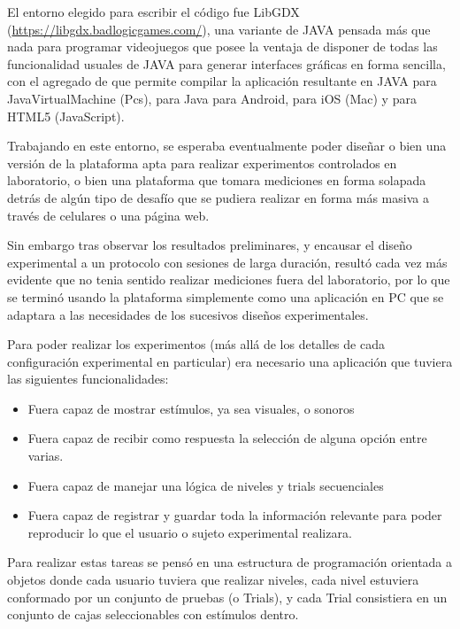 \documentclass{article}
\numberwithin{figure}{section}
\begin{document}
    El entorno elegido para escribir el código fue LibGDX (\url{https://libgdx.badlogicgames.com/}), una variante de JAVA pensada más que nada para programar videojuegos que posee la ventaja de disponer de todas las funcionalidad usuales de JAVA para generar interfaces gráficas en forma sencilla, con el agregado de que permite compilar la aplicación resultante en JAVA para JavaVirtualMachine (Pcs), para Java para Android, para iOS (Mac) y para HTML5 (JavaScript). 
    
    Trabajando en este entorno, se esperaba eventualmente poder diseñar o bien una versión de la plataforma apta para realizar experimentos controlados en laboratorio, o bien una plataforma que tomara mediciones en forma solapada detrás de algún tipo de desafío que se pudiera realizar en forma más masiva a través de celulares o una página web. 
    
    Sin embargo tras observar los resultados preliminares, y encausar el diseño experimental a un protocolo con sesiones de larga duración, resultó cada vez más evidente que no tenia sentido realizar mediciones fuera del laboratorio, por lo que se terminó usando la plataforma simplemente como una aplicación en PC que se adaptara a las necesidades de los sucesivos diseños experimentales. 
    
    Para poder realizar los experimentos (más allá de los detalles de cada configuración experimental en particular) era necesario una aplicación que tuviera las siguientes funcionalidades:
    
    \begin{itemize}
        \item Fuera capaz de mostrar estímulos, ya sea visuales, o sonoros
        \item Fuera capaz de recibir como respuesta la selección de alguna opción entre varias.
        \item Fuera capaz de manejar una lógica de niveles y trials secuenciales
        \item Fuera capaz de registrar y guardar toda la información relevante para poder reproducir lo que el usuario o sujeto experimental realizara. 
    \end{itemize}
    
    Para realizar estas tareas se pensó en una estructura de programación orientada a objetos donde cada usuario tuviera que realizar niveles, cada nivel estuviera conformado por un conjunto de pruebas (o Trials), y cada Trial consistiera en un conjunto de cajas seleccionables con estímulos dentro. 
    
\end{document}
